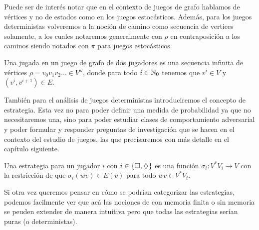 Puede ser de interés notar que en el contexto de juegos de grafo hablamos de
vértices y no de estados como en los juegos estocásticos. Además, para los
juegos deterministas volveremos a la noción de camino como secuencia de
vertices solamente, a los cuales notaremos generalmente con $\rho$ en
contraposición a los caminos siendo notados con $\pi$ para juegos estocásticos.

\begin{definition}
	Una jugada en un juego de grafo de dos jugadores es una secuencia infinita de vértices $\rho = v_0v_1v_2 \dots \in V^\omega$, donde para todo $i \in \mathbb{N}_0$ tenemos que $v^i \in V$ y $(v^i, v^{i+1}) \in E$.

\end{definition}

También para el análisis de juegos deterministas introduciremos el concepto de
estrategia. Esta vez no para poder definir una medida de probabilidad ya que no
necesitaremos una, sino para poder estudiar clases de comportamiento
adversarial y poder formular y responder preguntas de investigación que se
hacen en el contexto del estudio de juegos, las que precisaremos con más
detalle en el capítulo siguiente.


\begin{definition}
	Una estrategia para un jugador $i$ con $i \in \{\square, \diamondsuit\}$ es una función $\sigma_i: V^*V_i \rightarrow V$ con la restricción de que $\sigma_i(wv) \in E(v)$ para todo $wv \in V^*V_i$.
\end{definition}

Si otra vez queremos pensar en cómo se podrían categorizar las estrategias,
podemos facilmente ver que acá las nociones de con memoria finita o sin memoria
se peuden extender de manera intuitiva pero que todas las estrategias serían
puras (o deterministas).


